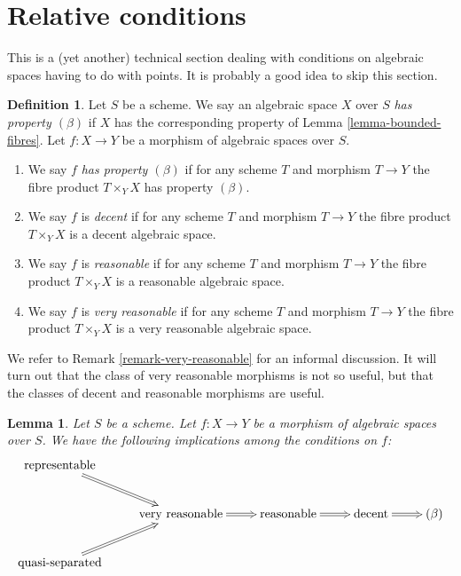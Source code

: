 \documentclass{stacks-project}
\theoremstyle{plain}
\newtheorem{lemma}[subsection]{Lemma}
\theoremstyle{definition}
\newtheorem{definition}[subsection]{Definition}
\theoremstyle{remark}
\numberwithin{equation}{subsection}
\begin{document}
\section{Relative conditions}
\label{section-relative-conditions}

\noindent
This is a (yet another) technical section dealing with conditions on
algebraic spaces having to do with points. It is probably a good idea
to skip this section.

\begin{definition}
\label{definition-relative-conditions}
Let $S$ be a scheme. We say an algebraic space $X$ over $S$
{\it has property $(\beta)$} if $X$ has the corresponding property of
Lemma \ref{lemma-bounded-fibres}.
Let $f : X \to Y$ be a morphism of algebraic spaces over $S$.
\begin{enumerate}
\item We say $f$ {\it has property $(\beta)$} if for any scheme $T$ and
morphism $T \to Y$ the fibre product $T \times_Y X$ has property $(\beta)$.
\item We say $f$ is {\it decent} if for any scheme $T$ and
morphism $T \to Y$ the fibre product $T \times_Y X$ is a decent
algebraic space.
\item We say $f$ is {\it reasonable} if for any scheme $T$ and
morphism $T \to Y$ the fibre product $T \times_Y X$ is a reasonable
algebraic space.
\item We say $f$ is {\it very reasonable} if for any scheme $T$ and
morphism $T \to Y$ the fibre product $T \times_Y X$ is a very reasonable
algebraic space.
\end{enumerate}
\end{definition}

\noindent
We refer to Remark \ref{remark-very-reasonable} for an informal discussion.
It will turn out that the class of very reasonable morphisms is not so
useful, but that the classes of decent and reasonable morphisms are useful.

\begin{lemma}
\label{lemma-properties-trivial-implications}
Let $S$ be a scheme.
Let $f : X \to Y$ be a morphism of algebraic spaces over $S$.
We have the following implications among the conditions on $f$:
$$
\xymatrix{
\text{representable} \ar@{=>}[rd] & & & & \\
& \text{very reasonable} \ar@{=>}[r] & \text{reasonable} \ar@{=>}[r] &
\text{decent} \ar@{=>}[r] & (\beta) \\
\text{quasi-separated} \ar@{=>}[ru] & & & &
}
$$
\end{lemma}
\end{document}

